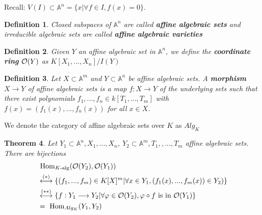 \documentclass[11pt]{article}
\newtheorem{thm}{Theorem}[section]
\newtheorem{dfn}[thm]{Definition}
\renewcommand{\hom}{\text{ Hom}}
\newcommand{\affn}{\mathbb A}
\newcommand{\calo}{{\cal O}}
\newcommand{\lrta}{\longrightarrow}
\newcommand{\llrta}{\longleftrightarrow}
\begin{document}
Recall: $V(I)\subset \affn^n =\{x|\forall f\in I, f(x)=0\}$.
\begin{dfn}
Closed subspaces of $\affn^n$ are called \textbf{affine algebraic sets} and irreducible algebraic sets are called \textbf{affine algebraic varieties}
\end{dfn}
\begin{dfn}
Given $Y$ an affine algebraic set in $\affn^n$, we define the \textbf{coordinate ring} $\calo(Y)$ as $K[X_1,...,X_n]/I(Y)$
\end{dfn}
\begin{dfn}
Let $X\subset \affn^m$ and $Y \subset \affn^n$ be affine algebraic sets. A \textbf{morphism} $X \lrta Y$ of affine algebraic sets is a map $f : X \lrta Y$ of the underlying sets such that there exist polynomials $f_1,...,f_n \in k[T_1,...,T_m]$ with $f(x) = (f_1(x),...,f_n(x))$ for all $x\in X$. 
\end{dfn}
We denote the category of affine algebraic sets over $K$ as $Alg_K$
\begin{thm}\label{thm:equivalence_of_categories_algebraic_sets_K_algebras}
Let $Y_1\subset \affn^n, X_1,...,X_n$, $Y_2\subset \affn^m, T_1,,..., T_m$ affine algebraic sets. There are bijections 
$$
\begin{aligned}
&\hom_{K\text{-alg}}(\calo(Y_2),\calo(Y_1))
\\
&\overset{(*)}{\llrta}\{(f_1,...,f_m)\in K[X]^m|\forall x\in Y_1,(f_1(x),...,f_m(x))\in Y_2) \}\\
&\overset{(**)}{\llrta} \{f:Y_1\lrta Y_2|\forall \varphi\in \calo(Y_2),\varphi\circ f\text{ is  in }  \calo(Y_1)\}\\
&=\hom_{Alg_K}(Y_1,Y_2)
\end{aligned}
$$
\end{thm}
\end{document}
